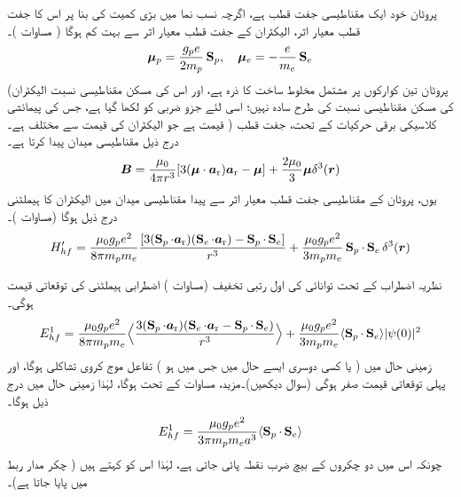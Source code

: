 پروٹان خود ایک مقناطیسی جفت قطب ہے، اگرچہ نسب نما میں بڑی کمیت کی بنا پر اس کا جفت قطب معیار اثر، الیکٹران کے جفت قطب معیار اثر سے بہت کم ہوگا ( مساوات )۔ 
\begin{align}
{\ensuremath{{\boldsymbol{\mu}}}}_p = \frac{g_p e}{2 m_p} \operatorname{\mathbf{S}}_p, \quad {\ensuremath{{\boldsymbol{\mu}}}}_e = - \frac{e}{m_e} \operatorname{\mathbf{S}}_e
\end{align}
(پروٹان تین کوارکوں پر مشتمل مخلوط ساخت کا ذرہ ہے، اور اس کی مسکن مقناطیسی نسبت الیکٹران کی مسکن مقناطیسی نسبت کی طرح سادہ نہیں؛ اسی لئے  جزو ضربی کو  لکھا گیا ہے، جس کی پیمائشی قیمت  ہے جو الیکٹران کی قیمت  سے مختلف ہے۔ ) کلاسیکی برقی حرکیات کے تحت، جفت قطب  درج ذیل مقناطیسی میدان پیدا کرتا ہے۔
\begin{align}\label{مساوات_غیر_مضطرب_پروٹان_میدان}
{\ensuremath{{\boldsymbol{B}}}} = \frac{\mu_0}{4 \pi r^3} [3 ({{\boldsymbol{\mu}}} \cdot {\ensuremath{{\boldsymbol{a}}}_{\textup{r}}}) {{\boldsymbol{a}}_{\textup{r}}} - {{\boldsymbol{\mu}}}] + \frac{2 \mu_0}{3} {{\boldsymbol{\mu}}} \delta^3 ({{\boldsymbol{r}}})
\end{align}
یوں، پروٹان کے مقناطیسی جفت قطب معیار اثر سے پیدا مقناطیسی میدان میں الیکٹران کا ہیملٹنی درج ذیل ہوگا (مساوات )۔ 
\begin{align}
H'_{hf} = \frac{\mu_0 g_p e^2}{8 \pi m_p m_e} \frac{[3(\operatorname{\mathbf{S}}_p \cdot {\ensuremath{{\boldsymbol{a}}}_{\textup{r}}})(\operatorname{\mathbf{S}}_e \cdot {\ensuremath{{\boldsymbol{a}}}_{\textup{r}}}) - \operatorname{\mathbf{S}}_p \cdot \operatorname{\mathbf{S}}_e]}{r^3} + \frac{\mu_0 g_p e^2}{3m_p m_e} \operatorname{\mathbf{S}}_p \cdot \operatorname{\mathbf{S}}_e \delta^3 ({{\boldsymbol{r}}})
\end{align}

نظریہ اضطراب کے تحت توانائی کی اول رتبی تخفیف (مساوات ) اضطرابی ہیملٹنی کی توقعاتی قیمت ہوگی۔
\begin{align}
E_{hf}^1 = \frac{\mu_0 g_p e^2}{8 \pi m_p m_e} \Big\langle \frac{3(\operatorname{\mathbf{S}}_p \cdot {\ensuremath{{\boldsymbol{a}}}_{\textup{r}}})(\operatorname{\mathbf{S}}_e \cdot {\ensuremath{{\boldsymbol{a}}}_{\textup{r}}} - \operatorname{\mathbf{S}}_p \cdot \operatorname{\mathbf{S}}_e)}{r^3} \Big\rangle + \frac{\mu _0 g_p e^2}{3 m_p m_e} \langle \operatorname{\mathbf{S}}_p \cdot \operatorname{\mathbf{S}}_e \rangle |\psi (0)|^2
\end{align}
زمینی حال میں ( یا کسی دوسری ایسے حال میں جس میں  ہو ) تفاعل موج کروی تشاکلی ہوگا، اور پہلی توقعاتی قیمت صفر ہوگی (سوال  دیکھیں)۔مزید، مساوات  کے تحت  ہوگا، لہٰذا زمینی حال میں درج ذیل ہوگا۔ 
\begin{align}
E_{hf}^1 = \frac{\mu_0 g_p e^2}{3 \pi m_p m_e a^3} \langle \operatorname{\mathbf{S}}_p \cdot \operatorname{\mathbf{S}}_e \rangle
\end{align}
چونکہ اس میں دو چکروں کے بیچ ضرب نقطہ پائی جاتی ہے، لہٰذا اس کو  کہتے ہیں ( چکر مدار ربط میں  پایا جاتا ہے)۔


